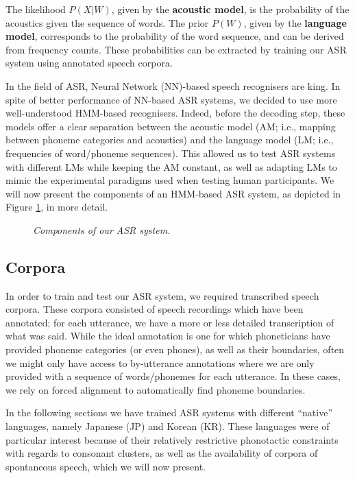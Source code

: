 The likelihood $P(X|W)$, given by the \textbf{acoustic model}, is the probability of the acoustics given the sequence of words. The prior $P(W)$, given by the \textbf{language model}, corresponds to the probability of the word sequence, and can be derived from frequency counts. These probabilities can be extracted by training our ASR system using annotated speech corpora.

In the field of ASR, Neural Network (NN)-based speech recognisers are king. In spite of better performance of NN-based ASR systems, we decided to use more well-understood HMM-based recognisers. Indeed, before the decoding step, these models offer a clear separation between the acoustic model (AM; i.e., mapping between phoneme categories and acoustics) and the language model (LM; i.e., frequencies of word/phoneme sequences). This allowed us to test ASR systems with different LMs while keeping the AM constant, as well as adapting LMs to mimic the experimental paradigms used when testing human participants.
We will now present the components of an HMM-based ASR system, as depicted in Figure \ref{fig:hmm_architecture}, in more detail.

\begin{figure}[htb]
\centering
\caption{{\color{red}\textit{Components of our ASR system.}}}
\label{fig:hmm_architecture}
\end{figure}

\subsection{Corpora}

In order to train and test our ASR system, we required transcribed speech corpora. These corpora consisted of speech recordings which have been annotated; for each utterance, we have a more or less detailed transcription of what was said.
While the ideal annotation is one for which phoneticians have provided phoneme categories (or even phones), as well as their boundaries, often we might only have access to by-utterance annotations where we are only provided with a sequence of words/phonemes for each utterance. In these cases, we rely on forced alignment to automatically find phoneme boundaries.

In the following sections we have trained ASR systems with different ``native'' languages, namely Japanese (JP) and Korean (KR). These languages were of particular interest because of their relatively restrictive phonotactic constraints with regards to consonant clusters, as well as the availability of corpora of spontaneous speech, which we will now present. 

